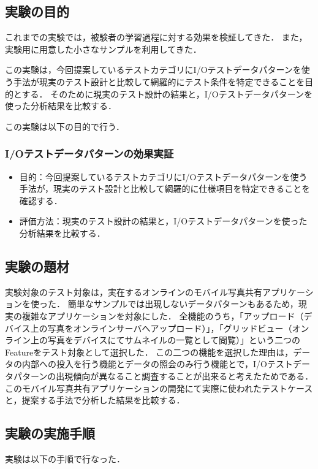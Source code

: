 \subsection{実験の目的} \label{sec:4-2-1}

これまでの実験では，被験者の学習過程に対する効果を検証してきた．
また，実験用に用意した小さなサンプルを利用してきた．

この実験は，今回提案しているテストカテゴリにI/Oテストデータパターンを使う手法が現実のテスト設計と比較して網羅的にテスト条件を特定できることを目的とする．
そのために現実のテスト設計の結果と，I/Oテストデータパターンを使った分析結果を比較する．

この実験は以下の目的で行う．

\subsubsection{I/Oテストデータパターンの効果実証}
\begin{itemize}
\item 目的：今回提案しているテストカテゴリにI/Oテストデータパターンを使う手法が，現実のテスト設計と比較して網羅的に仕様項目を特定できることを確認する．
\item 評価方法：現実のテスト設計の結果と，I/Oテストデータパターンを使った分析結果を比較する．
\end{itemize}

\subsection{実験の題材} \label{sec:4-2-3}

実験対象のテスト対象は，実在するオンラインのモバイル写真共有アプリケーションを使った．
簡単なサンプルでは出現しないデータパターンもあるため，現実の複雑なアプリケーションを対象にした．
全機能のうち，「アップロード（デバイス上の写真をオンラインサーバへアップロード）」，「グリッドビュー（オンライン上の写真をデバイスにてサムネイルの一覧として閲覧）」という二つのFeatureをテスト対象として選択した．
この二つの機能を選択した理由は，データの内部への投入を行う機能とデータの照会のみ行う機能とで，I/Oテストデータパターンの出現傾向が異なること調査することが出来ると考えたためである．
このモバイル写真共有アプリケーションの開発にて実際に使われたテストケースと，提案する手法で分析した結果を比較する．

\subsection{実験の実施手順}
実験は以下の手順で行なった．

